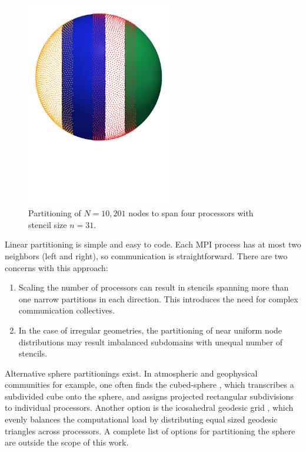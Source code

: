 \documentclass{report}
\begin{document}
\begin{figure}[ht!]
\begin{center}
\includegraphics[width=2.5in]{../figures/paper1/figures/vortex_rollup/4procs_N10K_n31.pdf}
\caption{Partitioning of $N=10,201$ nodes to span four processors with stencil size $n=31$. }
\label{fig:decomposed_sphere}
\end{center}
\end{figure}

Linear partitioning is simple and easy to code. Each MPI process has at most two neighbors (left and right), so communication is straightforward. There are two concerns with this approach: 
\begin{enumerate} 
\item Scaling the number of processors can result in stencils spanning more than one narrow partitions in each direction. This introduces the need for complex communication collectives. 
\item In the case of irregular geometries, the partitioning of near uniform node distributions may result imbalanced subdomains with unequal number of stencils.
\end{enumerate}

Alternative sphere partitionings exist. In atmospheric and geophysical communities for example, one often finds the cubed-sphere \cite{Ivan2011, Katta2012}, which transcribes a subdivided cube onto the sphere, and assigns projected rectangular subdivisions to individual processors. Another option is the icosahedral geodesic grid \cite{Randall2002}, which evenly balances the computational load by distributing equal sized geodesic triangles across processors. A complete list of options for partitioning the sphere are outside the scope of this work. %
\end{document}
